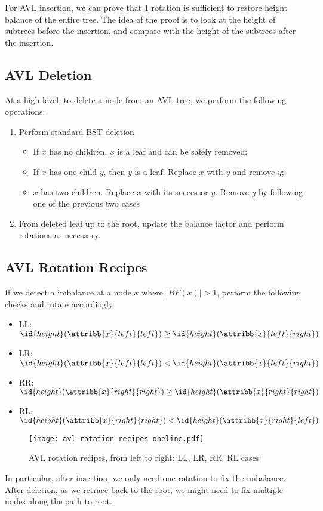 For AVL insertion, we can prove that 1 rotation is sufficient to restore height balance of the entire tree. The idea of the proof is to look at the height of subtrees before the insertion, and compare with the height of the subtrees after the insertion.

\subsection{AVL Deletion}

At a high level, to delete a node from an AVL tree, we perform the following operations:

\begin{enumerate}
    \item Perform standard BST deletion
    \begin{itemize}
        \item If $x$ has no children, $x$ is a leaf and can be safely removed;
        \item If $x$ has one child $y$, then $y$ is a leaf. Replace $x$ with $y$ and remove $y$;
        \item $x$ has two children. Replace $x$ with its successor $y$. Remove $y$ by following one of the previous two cases
    \end{itemize}
    \item From deleted leaf up to the root, update the balance factor and perform rotations as necessary.
\end{enumerate}

\subsection{AVL Rotation Recipes}

If we detect a imbalance at a node $x$ where $|BF(x)| > 1$, perform the following checks and rotate accordingly

\begin{itemize}
    \item LL: $\id{height}(\attribb{x}{left}{left}) \geq \id{height}(\attribb{x}{left}{right})$ 
    \item LR: $\id{height}(\attribb{x}{left}{left}) < \id{height}(\attribb{x}{left}{right})$ 
    \item RR: $\id{height}(\attribb{x}{right}{right}) \geq \id{height}(\attribb{x}{right}{right})$ 
    \item RL: $\id{height}(\attribb{x}{right}{right}) < \id{height}(\attribb{x}{right}{left})$ 
\end{itemize}

\begin{figure}[htbp]
    \centering
    \texttt{[image: avl-rotation-recipes-oneline.pdf]}
    \caption{AVL rotation recipes, from left to right: LL, LR, RR, RL cases}
    \label{fig:avl-rotation}
\end{figure}

In particular, after insertion, we only need one rotation to fix the imbalance. After deletion, as we retrace back to the root, we might need to fix multiple nodes along the path to root.